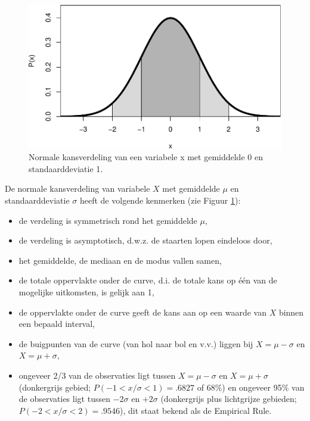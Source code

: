\documentclass[
]{book}
\begin{document}
\begin{figure}
\centering
\includegraphics{KMS-NL_files/figure-latex/normaalkansverdeling-1.pdf}
\caption{\label{fig:normaalkansverdeling}Normale kansverdeling van een variabele x met gemiddelde 0 en standaarddeviatie 1.}
\end{figure}

De normale kansverdeling van variabele \(X\) met gemiddelde \(\mu\) en
standaarddeviatie \(\sigma\) heeft de volgende kenmerken (zie
Figuur \ref{fig:normaalkansverdeling}):

\begin{itemize}
\item
  de verdeling is symmetrisch rond het gemiddelde \(\mu\),
\item
  de verdeling is asymptotisch, d.w.z. de staarten lopen eindeloos
  door,
\item
  het gemiddelde, de mediaan en de modus vallen samen,
\item
  de totale oppervlakte onder de curve, d.i. de totale kans op één van
  de mogelijke uitkomsten, is gelijk aan 1,
\item
  de oppervlakte onder de curve geeft de kans aan op een waarde van \(X\) binnen een bepaald interval,
\item
  de buigpunten van de curve (van hol naar bol en v.v.) liggen bij
  \(X=\mu-\sigma\) en \(X=\mu+\sigma\),
\item
  ongeveer 2/3 van de observaties ligt
  tussen \(X=\mu-\sigma\) en \(X=\mu+\sigma\) (donkergrijs gebied;
  \(P(-1<x/\sigma<1)=.6827\) of 68\%) en ongeveer 95\% van de observaties ligt
  tussen \(-2\sigma\) en \(+2\sigma\) (donkergrijs plus lichtgrijze
  gebieden; \(P(-2<x/\sigma<2)=.9546\)), dit staat bekend als de
  Empirical Rule.
\end{itemize}
\end{document}
